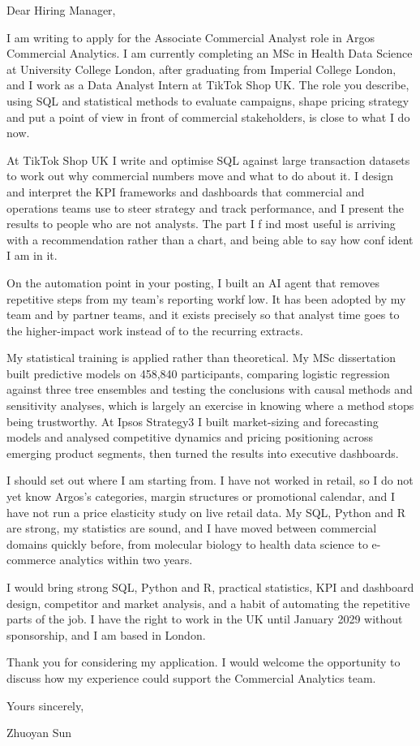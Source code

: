 \documentclass[letterpaper,11pt]{article}
\begin{document}
Dear Hiring Manager,

I am writing to apply for the Associate Commercial Analyst role in Argos Commercial Analytics. I am currently completing an MSc in Health Data Science at University College London, after graduating from Imperial College London, and I work as a Data Analyst Intern at TikTok Shop UK. The role you describe, using SQL and statistical methods to evaluate campaigns, shape pricing strategy and put a point of view in front of commercial stakeholders, is close to what I do now.

At TikTok Shop UK I write and optimise SQL against large transaction datasets to work out why commercial numbers move and what to do about it. I design and interpret the KPI frameworks and dashboards that commercial and operations teams use to steer strategy and track performance, and I present the results to people who are not analysts. The part I f\kern0pt ind most useful is arriving with a recommendation rather than a chart, and being able to say how conf\kern0pt ident I am in it.

On the automation point in your posting, I built an AI agent that removes repetitive steps from my team's reporting workf\kern0pt low. It has been adopted by my team and by partner teams, and it exists precisely so that analyst time goes to the higher-impact work instead of to the recurring extracts.

My statistical training is applied rather than theoretical. My MSc dissertation built predictive models on 458,840 participants, comparing logistic regression against three tree ensembles and testing the conclusions with causal methods and sensitivity analyses, which is largely an exercise in knowing where a method stops being trustworthy. At Ipsos Strategy3 I built market-sizing and forecasting models and analysed competitive dynamics and pricing positioning across emerging product segments, then turned the results into executive dashboards.

I should set out where I am starting from. I have not worked in retail, so I do not yet know Argos's categories, margin structures or promotional calendar, and I have not run a price elasticity study on live retail data. My SQL, Python and R are strong, my statistics are sound, and I have moved between commercial domains quickly before, from molecular biology to health data science to e-commerce analytics within two years.

I would bring strong SQL, Python and R, practical statistics, KPI and dashboard design, competitor and market analysis, and a habit of automating the repetitive parts of the job. I have the right to work in the UK until January 2029 without sponsorship, and I am based in London.

Thank you for considering my application. I would welcome the opportunity to discuss how my experience could support the Commercial Analytics team.

\vspace{2pt}
Yours sincerely,

\vspace{8pt}
Zhuoyan Sun
\end{document}
